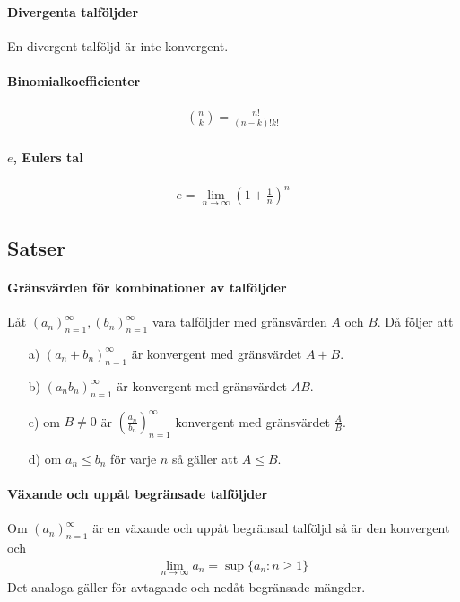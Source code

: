 \paragraph{Divergenta talföljder}
En divergent talföljd är inte konvergent.

\paragraph{Binomialkoefficienter}
\begin{align*}
	\left(\frac{n}{k}\right) = \frac{n!}{(n-k)!k!}
\end{align*}

\paragraph{$e$, Eulers tal}
\begin{align*}
	e = \lim_{n\to\infty}\left(1 + \frac{1}{n}\right)^{n}
\end{align*}

\subsection{Satser}

\paragraph{Gränsvärden för kombinationer av talföljder}
Låt $\left(a_n\right)_{n = 1}^\infty, \left(b_n\right)_{n = 1}^\infty$ vara talföljder med gränsvärden $A$ och $B$. Då följer att
\begin{enumerate}
	\item[a)] $\left(a_n + b_n\right)_{n = 1}^\infty$ är konvergent med gränsvärdet $A + B$.
	\item[b)] $\left(a_n b_n\right)_{n = 1}^\infty$ är konvergent med gränsvärdet $AB$.
	\item[c)] om $B \neq 0$ är $\left(\frac{a_n}{b_n}\right)_{n = 1}^\infty$ konvergent med gränsvärdet $\frac{A}{B}$.
	\item[d)] om $a_n \leq b_n$ för varje $n$ så gäller att $A \leq B$.
\end{enumerate}

\proof

\paragraph{Växande och uppåt begränsade talföljder}
Om $\left(a_n\right)_{n = 1}^\infty$ är en växande och uppåt begränsad talföljd så är den konvergent och
\begin{align*}
	\lim_{n\to\infty} a_n = \sup{\{a_n: n \geq 1\}}
\end{align*}
Det analoga gäller för avtagande och nedåt begränsade mängder.

